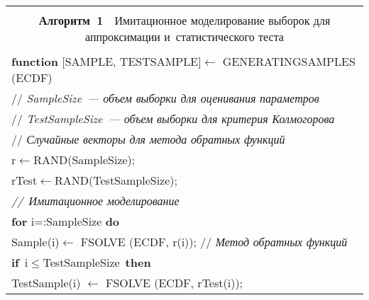 \begin{multicols}{2}
\renewcommand{\tablename}{\protect\bf Алгоритм}
\begin{table*}[b]\small %
\vspace*{9pt}
\begin{center}
\begin{tabular}{l}
\hline
\\[-8pt]
\multicolumn{1}{c}{{\tablename\ 1}\ \  Имитационное моделирование выборок для аппроксимации 
и~статистического теста}\\[3pt]
\hline
\\[-8pt]
\textbf{function} [{\normalsize{S}}AMPLE, 
{\normalsize{T}}EST{\normalsize{S}}AMPLE]$\gets$
{\normalsize{G}}ENERATING{\normalsize{S}}AMPLES ({\normalsize{ECDF}})\\
\hspace*{5mm}// \textit{SampleSize~--- объем выборки для оценивания 
параметров}\\
\hspace*{5mm}// \textit{TestSampleSize~--- объем выборки для критерия 
Колмогорова}\\
\hspace*{5mm}// \textit{Случайные векторы для метода обратных функций}\\
\hspace*{5mm}r$\gets${\normalsize{R}}AND(SampleSize);\\
\hspace*{5mm}rTest$\gets${\normalsize{R}}AND(TestSampleSize);\\
\textit{//~Имитационное 
моделирование}\\
\hspace*{5mm}\textbf{for} i\;=\;1:SampleSize \textbf{do}\\
\hspace*{10mm}Sample(i)$\gets$ {FSOLVE} ({\normalsize{ECDF}, r(i)}); // 
\textit{Метод обратных функций}\\
\hspace*{10mm}\textbf{if}\ i$\leqslant$TestSampleSize\ \textbf{then}\\
\hspace*{15mm}TestSample(i) $\gets$ {{FSOLVE}} ({\normalsize{ECDF}}, rTest(i));\\
\hline
\end{tabular}
\end{center}
\end{table*}



\end{multicols}
